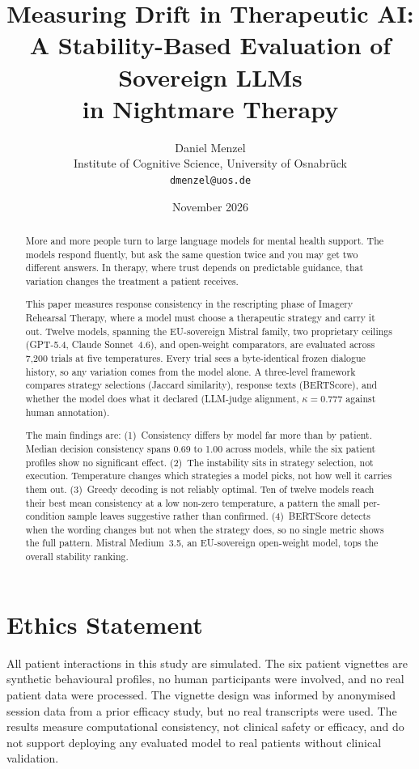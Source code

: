 \documentclass[11pt]{article}
\title{Measuring Drift in Therapeutic AI:\\
A Stability-Based Evaluation of Sovereign LLMs\\ in Nightmare Therapy}
\author{
  Daniel Menzel\\
  Institute of Cognitive Science, University of Osnabr\"uck\\
  \texttt{dmenzel@uos.de}
}
\date{November 2026}
\begin{document}
\maketitle

\begin{abstract}
More and more people turn to large language models for mental health support. The models respond fluently, but ask the same question twice and you may get two different answers. In therapy, where trust depends on predictable guidance, that variation changes the treatment a patient receives.

This paper measures response consistency in the rescripting phase of Imagery Rehearsal Therapy, where a model must choose a therapeutic strategy and carry it out. Twelve models, spanning the EU-sovereign Mistral family, two proprietary ceilings (GPT-5.4, Claude Sonnet~4.6), and open-weight comparators, are evaluated across 7{,}200 trials at five temperatures. Every trial sees a byte-identical frozen dialogue history, so any variation comes from the model alone. A three-level framework compares strategy selections (Jaccard similarity), response texts (BERTScore), and whether the model does what it declared (LLM-judge alignment, $\kappa = 0.777$ against human annotation).

The main findings are: (1)~Consistency differs by model far more than by patient. Median decision consistency spans 0.69 to 1.00 across models, while the six patient profiles show no significant effect. (2)~The instability sits in strategy selection, not execution. Temperature changes which strategies a model picks, not how well it carries them out. (3)~Greedy decoding is not reliably optimal. Ten of twelve models reach their best mean consistency at a low non-zero temperature, a pattern the small per-condition sample leaves suggestive rather than confirmed. (4)~BERTScore detects when the wording changes but not when the strategy does, so no single metric shows the full pattern. Mistral Medium~3.5, an EU-sovereign open-weight model, tops the overall stability ranking.
\end{abstract}









\section*{Ethics Statement}
All patient interactions in this study are simulated. The six patient vignettes are synthetic behavioural profiles, no human participants were involved, and no real patient data were processed. The vignette design was informed by anonymised session data from a prior efficacy study, but no real transcripts were used. The results measure computational consistency, not clinical safety or efficacy, and do not support deploying any evaluated model to real patients without clinical validation.




\appendix

\end{document}
